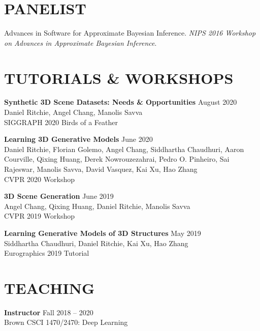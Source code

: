 \documentclass[line,margin]{res}
\begin{document}
\begin{resume}
\section{PANELIST}

\newcommand{\panelist}[2]{
	#1. \emph{#2}.
}

\panelist{Advances in Software for Approximate Bayesian Inference}{NIPS 2016 Workshop on Advances in Approximate Bayesian Inference}


\section{TUTORIALS \& WORKSHOPS}

\newcommand{\tutorial}[4] {
	\textbf{#1} \hfill #4\\
	#2\\
	#3
}
\newcommand{\workshop}[4] {
	\textbf{#1} \hfill #4\\
	#2\\
	#3
}

\workshop
{Synthetic 3D Scene Datasets: Needs \& Opportunities}
{Daniel Ritchie, Angel Chang, Manolis Savva}
{SIGGRAPH 2020 Birds of a Feather}
{August 2020}


\workshop
{Learning 3D Generative Models}
{Daniel Ritchie, Florian Golemo, Angel Chang, Siddhartha Chaudhuri, Aaron Courville, Qixing Huang, Derek Nowrouzezahrai, Pedro O. Pinheiro, Sai Rajeswar, Manolis Savva, David Vasquez, Kai Xu, Hao Zhang}
{CVPR 2020 Workshop}
{June 2020}

\workshop
{3D Scene Generation}
{Angel Chang, Qixing Huang, Daniel Ritchie, Manolis Savva}
{CVPR 2019 Workshop}
{June 2019}

\tutorial
{Learning Generative Models of 3D Structures}
{Siddhartha Chaudhuri, Daniel Ritchie, Kai Xu, Hao Zhang}
{Eurographics 2019 Tutorial}
{May 2019}


\section{TEACHING}

\newcommand{\teach}[3] {
	\textbf{#1} \hfill #3\\
	#2
}

\teach
{Instructor}
{Brown CSCI 1470/2470: Deep Learning}
{Fall 2018 -- 2020}


\end{resume}
\end{document}
